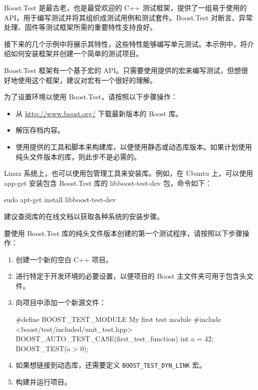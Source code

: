 
Boost.Test 是最古老，也是最受欢迎的 C++ 测试框架，提供了一组易于使用的 API，用于编写测试并将其组织成测试用例和测试套件。Boost.Test 对断言、异常处理、固件等测试框架所需的重要特性支持良好。

接下来的几个示例中将展示其特性，这些特性能够编写单元测试。本示例中，将介绍如何安装框架并创建一个简单的测试项目。


Boost.Test 框架有一个基于宏的 API。只需要使用提供的宏来编写测试，但想很好地使用这个框架，建议对宏有一个很好的理解。


为了设置环境以使用 Boost.Test，请按照以下步骤操作：

\begin{itemize}
\item
从 \url{http://www.boost.org/} 下载最新版本的 Boost 库。

\item
解压存档内容。

\item
使用提供的工具和脚本来构建库，以便使用静态或动态库版本。如果计划使用纯头文件版本的库，则此步不是必需的。
\end{itemize}

Linux 系统上，也可以使用包管理工具来安装库。例如，在 Ubuntu 上，可以使用 app-get 安装包含 Boost.Test 库的 libboost-test-dev 包，命令如下：

\begin{shell}
sudo apt-get install libboost-test-dev
\end{shell}

\begin{myNotic}
建议查阅库的在线文档以获取各种系统的安装步骤。
\end{myNotic}

要使用 Boost.Test 库的纯头文件版本创建的第一个测试程序，请按照以下步骤操作：

\begin{enumerate}
\item
创建一个新的空白 C++ 项目。

\item
进行特定于开发环境的必要设置，以便项目的 Boost 主文件夹可用于包含头文件。

\item
向项目中添加一个新源文件：

\begin{cpp}
#define BOOST_TEST_MODULE My first test module
#include <boost/test/included/unit_test.hpp>
BOOST_AUTO_TEST_CASE(first_test_function)
{
    int a = 42;
    BOOST_TEST(a > 0);
}
\end{cpp}

\item
如果想链接到动态库，还需要定义 \verb|BOOST_TEST_DYN_LINK| 宏。

\item
构建并运行项目。
\end{enumerate}

